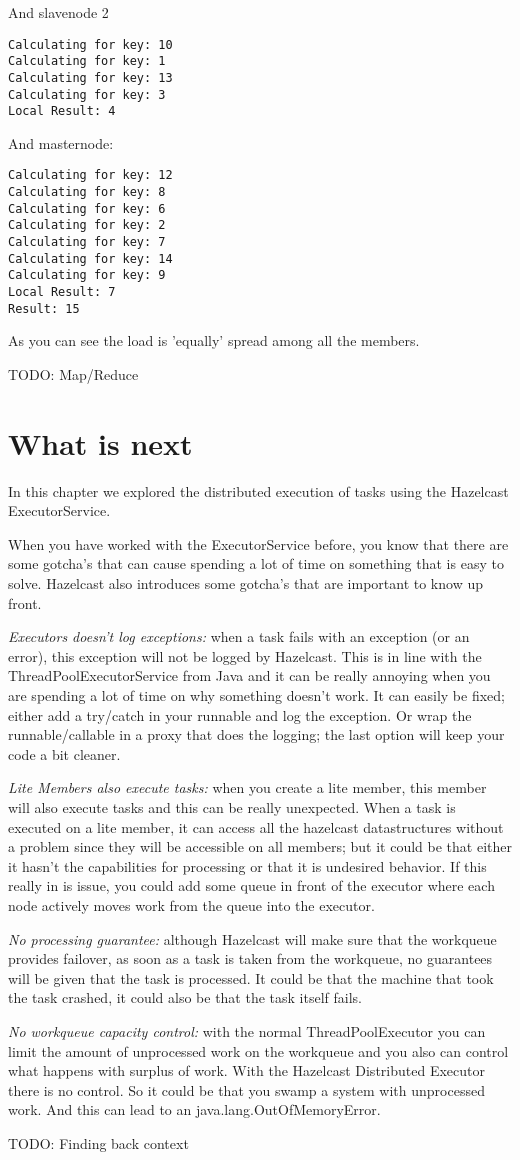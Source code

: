 And slavenode 2
\begin{verbatim}
Calculating for key: 10
Calculating for key: 1
Calculating for key: 13
Calculating for key: 3
Local Result: 4
\end{verbatim}

And masternode:
\begin{verbatim}
Calculating for key: 12
Calculating for key: 8
Calculating for key: 6
Calculating for key: 2
Calculating for key: 7
Calculating for key: 14
Calculating for key: 9
Local Result: 7
Result: 15
\end{verbatim}

As you can see the load is 'equally' spread among all the members. 

TODO: Map/Reduce

\section{What is next}
In this chapter we explored the distributed execution of tasks using the Hazelcast ExecutorService. 

When you have worked with the ExecutorService before, you know that there are some gotcha's that can cause spending a lot of time on something that is easy to solve. Hazelcast also introduces some gotcha's that are important to know up front.

\emph{Executors doesn't log exceptions:} when a task fails with an exception (or an error), this exception will not be logged by Hazelcast. This is in line with the ThreadPoolExecutorService from Java and it can be really annoying when you are spending a lot of time on why something doesn't work. It can easily be fixed; either add a try/catch in your runnable and log the exception. Or wrap the runnable/callable in a proxy that does the logging; the last option will keep your code a bit cleaner. 

\emph{Lite Members also execute tasks:} when you create a lite member, this member will also execute tasks and this can be really unexpected. When a task is executed on a lite member, it can access all the hazelcast datastructures without a problem since they will be accessible on all members; but it could be that either it hasn't the capabilities for processing or that it is undesired behavior. If this really in is issue, you could add some queue in front of the executor where each node actively moves work from the queue into the executor.

\emph{No processing guarantee:} although Hazelcast will make sure that the workqueue provides failover, as soon as a task is taken from the workqueue, no guarantees will be given that the task is processed. It could be that the machine that took the task crashed, it could also be that the task itself fails. 

\emph{No workqueue capacity control:} with the normal ThreadPoolExecutor you can limit the amount of unprocessed work on the workqueue and you also can control what happens with surplus of work. With the Hazelcast Distributed Executor there is no control. So it could be that you swamp a system with unprocessed work. And this can lead to an java.lang.OutOfMemoryError.

TODO: Finding back context

